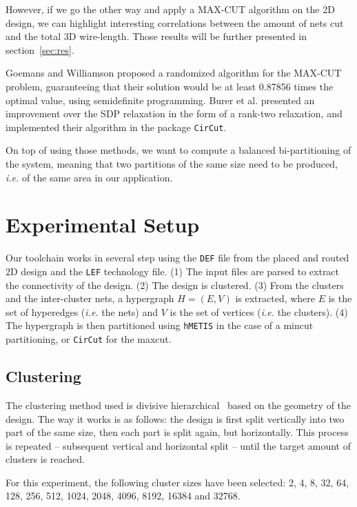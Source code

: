 \documentclass[conference]{IEEEtran}
\begin{document}
However, if we go the other way and apply a MAX-CUT algorithm on the 2D design, we can highlight interesting correlations between the amount of nets cut and the total 3D wire-length.
Those results will be further presented in section~\ref{sec:res}.



Goemans and Williamson \cite{Goemans1995} proposed a randomized algorithm for the MAX-CUT problem, guaranteeing that their solution would be at least 0.87856 times the optimal value, using semidefinite programming. Burer et al. \cite{Burer2000} presented an improvement over the SDP relaxation in the form of a rank-two relaxation, and implemented their algorithm in the package \texttt{CirCut}.

On top of using those methods, we want to compute a balanced bi-partitioning of the system, meaning that two partitions of the same size need to be produced, \textit{i.e.} of the same area in our application.



\section{Experimental Setup}

Our toolchain works in several step using the \texttt{DEF} file from the placed and routed 2D design and the \texttt{LEF} technology file.
(1) The input files are parsed to extract the connectivity of the design.
(2) The design is clustered.
(3) From the clusters and the inter-cluster nets, a hypergraph $H = (E, V)$ is extracted, where $E$ is the set of hyperedges (\textit{i.e.} the nets) and $V$ is the set of vertices (\textit{i.e.} the clusters).
(4) The hypergraph is then partitioned using \texttt{hMETIS} in the case of a mincut partitioning, or \texttt{CirCut} for the maxcut.

\subsection{Clustering}
The clustering method used is divisive hierarchical~\cite{Rokach2005} based on the geometry of the design.
The way it works is as follows: the design is first split vertically into two part of the same size, then each part is split again, but horizontally.
This process is repeated -- subsequent vertical and horizontal split -- until the target amount of clusters is reached.

For this experiment, the following cluster sizes have been selected: 2, 4, 8, 32, 64, 128, 256, 512, 1024, 2048, 4096, 8192, 16384 and 32768.
\end{document}
